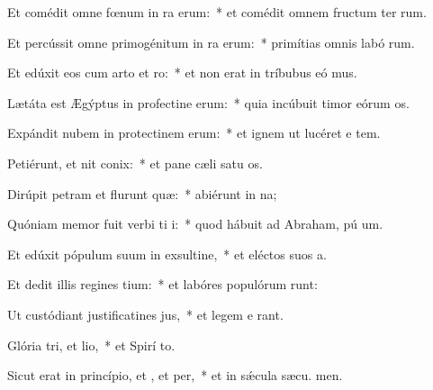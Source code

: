\item Et comédit omne fœnum in ra erum:~* et comédit omnem fructum ter rum.
\item Et percússit omne primogénitum in ra erum:~* primítias omnis labó rum.
\item Et edúxit eos cum arto et ro:~* et non erat in tríbubus eó mus.
\item Lætáta est Ægýptus in profectine erum:~* quia incúbuit timor eórum  os.
\item Expándit nubem in protectinem erum:~* et ignem ut lucéret e  tem.
\item Petiérunt, et nit conix:~* et pane cæli satu os.
\item Dirúpit petram et flurunt quæ:~* abiérunt in  na;
\item Quóniam memor fuit verbi ti i:~* quod hábuit ad Abraham, pú um.
\item Et edúxit pópulum suum in exsultine,~* et eléctos suos  a.
\item Et dedit illis regines tium:~* et labóres populórum runt:
\item Ut custódiant justificatines jus,~* et legem e rant.
\item Glória tri, et lio,~* et Spirí to.
\item Sicut erat in princípio, et , et per,~* et in sǽcula sæcu. men.
